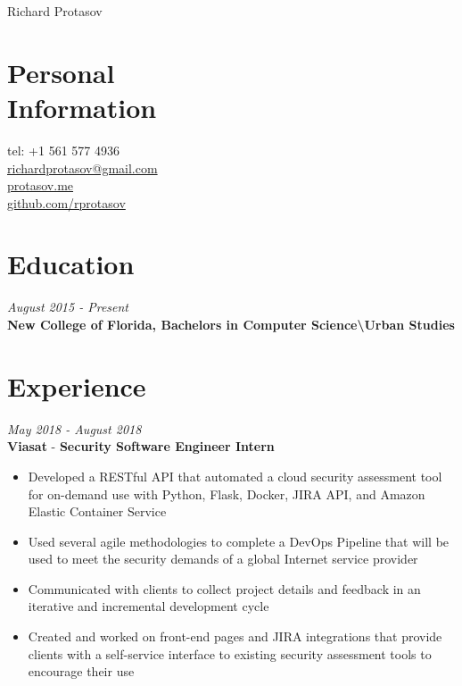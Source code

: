 \documentclass[margin,line,a4paper]{resume}
\begin{document}
{\sc \Huge Richard Protasov}
\begin{resume}
    \vspace{0cm}

    \section{\mysidestyle Personal\\Information}
    tel: +1 561 577 4936 \\
    \href{mailto:richardprotasov@gmail.com}{richardprotasov@gmail.com} \\
    \href{https://protasov.me}{protasov.me}\\
    \href{https://github.com/rprotasov}{github.com/rprotasov}
    
    \section{\mysidestyle Education}
        \textit{August 2015 - Present}\\
        \textbf{New College of Florida, Bachelors in Computer Science\textbackslash Urban Studies}
        
    \section{\mysidestyle Experience}
        \textit{May 2018 - August 2018}\\
        \textbf{Viasat} - \textbf{Security Software Engineer Intern}
        \begin{itemize}
            \item Developed a RESTful API that automated a cloud security assessment tool for on-demand use with Python, Flask, Docker, JIRA API, and Amazon Elastic Container Service
            \item Used several agile methodologies to complete a DevOps Pipeline that will be used to meet the security demands of a global Internet service provider
            \item Communicated with clients to collect project details and feedback in an iterative and incremental development cycle
            \item Created and worked on front-end pages and JIRA integrations that provide clients with a self-service interface to existing security assessment tools to encourage their use
        \end{itemize}


\end{resume}
\end{document}
